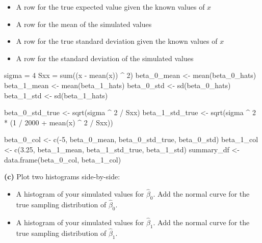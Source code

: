 \documentclass[
]{article}
\newenvironment{Shaded}{\begin{snugshade}}{\end{snugshade}}
\newcommand{\DecValTok}[1]{\textcolor[rgb]{0.00,0.00,0.81}{#1}}
\newcommand{\FloatTok}[1]{\textcolor[rgb]{0.00,0.00,0.81}{#1}}
\newcommand{\FunctionTok}[1]{\textcolor[rgb]{0.00,0.00,0.00}{#1}}
\newcommand{\NormalTok}[1]{#1}
\newcommand{\OtherTok}[1]{\textcolor[rgb]{0.56,0.35,0.01}{#1}}
\newcommand{\SpecialCharTok}[1]{\textcolor[rgb]{0.00,0.00,0.00}{#1}}
\providecommand{\tightlist}{%
  \setlength{\itemsep}{0pt}\setlength{\parskip}{0pt}}
\begin{document}
\begin{itemize}
\tightlist
\item
  A row for the true expected value given the known values of \(x\)
\item
  A row for the mean of the simulated values
\item
  A row for the true standard deviation given the known values of \(x\)
\item
  A row for the standard deviation of the simulated values
\end{itemize}

\begin{Shaded}
\begin{Highlighting}[]
\NormalTok{sigma }\OtherTok{=} \DecValTok{4}
\NormalTok{Sxx }\OtherTok{=} \FunctionTok{sum}\NormalTok{((x }\SpecialCharTok{{-}} \FunctionTok{mean}\NormalTok{(x)) }\SpecialCharTok{\^{}} \DecValTok{2}\NormalTok{)}
\NormalTok{beta\_0\_mean }\OtherTok{\textless{}{-}} \FunctionTok{mean}\NormalTok{(beta\_0\_hats)}
\NormalTok{beta\_1\_mean }\OtherTok{\textless{}{-}} \FunctionTok{mean}\NormalTok{(beta\_1\_hats)}
\NormalTok{beta\_0\_std }\OtherTok{\textless{}{-}} \FunctionTok{sd}\NormalTok{(beta\_0\_hats)}
\NormalTok{beta\_1\_std }\OtherTok{\textless{}{-}} \FunctionTok{sd}\NormalTok{(beta\_1\_hats)}

\NormalTok{beta\_0\_std\_true }\OtherTok{\textless{}{-}} \FunctionTok{sqrt}\NormalTok{(sigma }\SpecialCharTok{\^{}} \DecValTok{2} \SpecialCharTok{/}\NormalTok{ Sxx)}
\NormalTok{beta\_1\_std\_true }\OtherTok{\textless{}{-}} \FunctionTok{sqrt}\NormalTok{(sigma }\SpecialCharTok{\^{}} \DecValTok{2} \SpecialCharTok{*}\NormalTok{ (}\DecValTok{1} \SpecialCharTok{/} \DecValTok{2000} \SpecialCharTok{+} \FunctionTok{mean}\NormalTok{(x) }\SpecialCharTok{\^{}} \DecValTok{2} \SpecialCharTok{/}\NormalTok{ Sxx))}

\NormalTok{beta\_0\_col }\OtherTok{\textless{}{-}} \FunctionTok{c}\NormalTok{(}\SpecialCharTok{{-}}\DecValTok{5}\NormalTok{, beta\_0\_mean, beta\_0\_std\_true, beta\_0\_std)}
\NormalTok{beta\_1\_col }\OtherTok{\textless{}{-}} \FunctionTok{c}\NormalTok{(}\FloatTok{3.25}\NormalTok{, beta\_1\_mean, beta\_1\_std\_true, beta\_1\_std)}
\NormalTok{summary\_df }\OtherTok{\textless{}{-}} \FunctionTok{data.frame}\NormalTok{(beta\_0\_col, beta\_1\_col)}
\end{Highlighting}
\end{Shaded}

\textbf{(c)} Plot two histograms side-by-side:

\begin{itemize}
\tightlist
\item
  A histogram of your simulated values for \(\hat{\beta}_0\). Add the
  normal curve for the true sampling distribution of \(\hat{\beta}_0\).
\item
  A histogram of your simulated values for \(\hat{\beta}_1\). Add the
  normal curve for the true sampling distribution of \(\hat{\beta}_1\).
\end{itemize}
\end{document}
